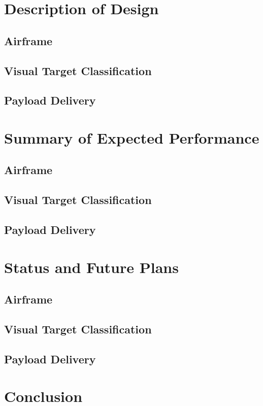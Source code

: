 \documentclass[]{auvsi_doc}
\begin{document}
\section{Description of Design}
\subsection{Airframe}
\subsection{Visual Target Classification}
\subsection{Payload Delivery}
\section{Summary of Expected Performance}
\subsection{Airframe}
\subsection{Visual Target Classification}
\subsection{Payload Delivery}
\section{Status and Future Plans}
\subsection{Airframe}
\subsection{Visual Target Classification}
\subsection{Payload Delivery}
\section{Conclusion}

\end{document}
